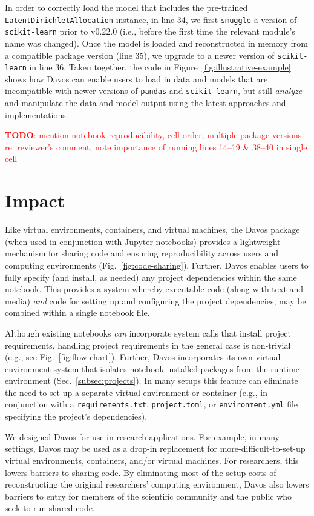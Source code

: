 \documentclass[preprint,12pt,a4paper]{elsarticle}
\newcommand{\todo}[1]{\textcolor{red}{\textbf{TODO}: #1}}
\begin{document}
In order to correctly load the model that includes the pre-trained
\texttt{LatentDirichlet\-Allocation} instance, in line 34, we first
\texttt{smuggle} a version of \texttt{scikit-learn} prior to v0.22.0 (i.e.,
before the first time the relevant module's name was changed).  Once
the model is loaded and reconstructed in memory from a compatible
package version (line 35), we upgrade to a newer version of
\texttt{scikit-learn} in line 36.  Taken together, the code in
Figure~\ref{fig:illustrative-example} shows how Davos can
enable users to load in data and models that are incompatible with
newer versions of \texttt{pandas} and \texttt{scikit-learn}, but still
\textit{analyze} and manipulate the data and model output using the
latest approaches and implementations.

\todo{mention notebook reproducibility, cell order, multiple package versions re: reviewer's comment; note importance of running lines 14--19 \& 38--40 in single cell}


\section{Impact}

Like virtual environments, containers, and virtual machines, the
Davos package (when used in conjunction with Jupyter
notebooks) provides a light\-weight mechanism for sharing code and
ensuring reproducibility across users and computing environments
(Fig.~\ref{fig:code-sharing}). Further, Davos enables users
to fully specify (and install, as needed) any project dependencies
within the same notebook. This provides a system whereby executable
code (along with text and media) \textit{and} code for setting up and
configuring the project dependencies, may be combined within a single
notebook file.

Although existing notebooks \textit{can} incorporate system calls that install
project requirements, handling project requirements in the general case is
non-trivial (e.g., see Fig.~\ref{fig:flow-chart}). Further, Davos
incorporates its own virtual environment system that isolates
notebook-installed packages from the runtime environment
(Sec.~\ref{subsec:projects}). In many setups this feature can eliminate the
need to set up a separate virtual environment or container (e.g., in
conjunction with a \texttt{requirements.txt}, \texttt{project.toml}, or
\texttt{environment.yml} file specifying the project's dependencies).

We designed Davos for use in research applications. For
example, in many settings, Davos may be used as a drop-in
replacement for more-difficult-to-set-up virtual environments,
containers, and/or virtual machines. For researchers, this lowers
barriers to sharing code. By eliminating most of the setup costs of
reconstructing the original researchers' computing environment,
Davos also lowers barriers to entry for members of the
scientific community and the public who seek to run shared code.
\end{document}

